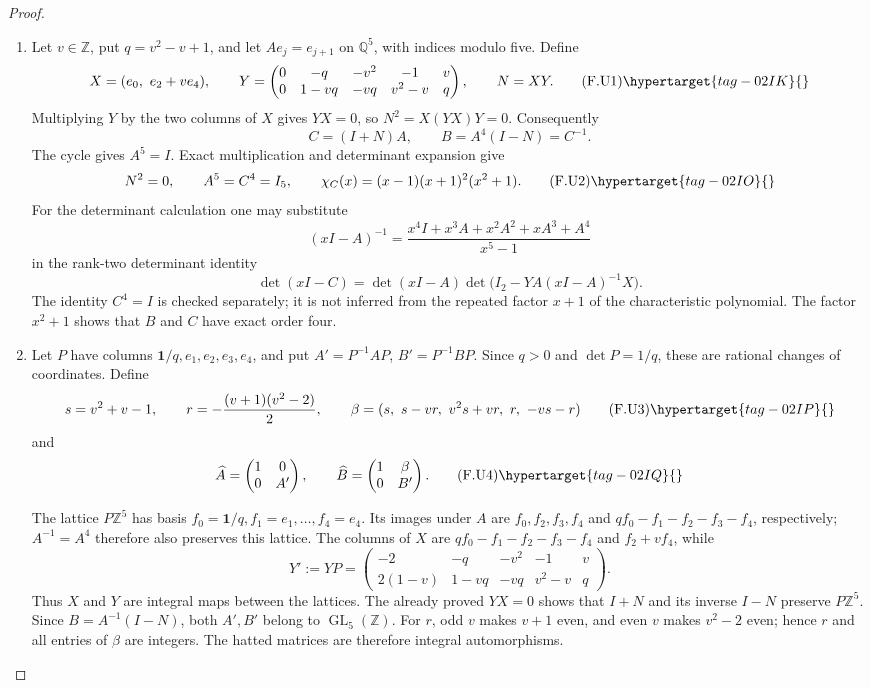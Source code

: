 \begin{proof}
\begin{enumerate}[label={$\langle1\rangle$\arabic*.}]
\item Let $v\in\mathbb Z$, put $q=v^2-v+1$, and let
$Ae_j=e_{j+1}$ on $\mathbb Q^5$, with indices modulo five. Define
\[
 X=(e_0,\ e_2+ve_4),\qquad
 Y=\begin{pmatrix}
 0&-q&-v^2&-1&v\\
 0&1-vq&-vq&v^2-v&q
 \end{pmatrix},\qquad N=XY.
 \tag{F.U1}\hypertarget{tag-02IK}{}\label{maps:eq:F.U1}
\]
Multiplying $Y$ by the two columns of $X$ gives $YX=0$, so
$N^2=X(YX)Y=0$. Consequently
\[
 C=(I+N)A,\qquad B=A^4(I-N)=C^{-1}.
\]
The cycle gives $A^5=I$. Exact multiplication and determinant
expansion give
\[
 N^2=0,\qquad A^5=C^4=I_5,\qquad
 \chi_C(x)=(x-1)(x+1)^2(x^2+1).
 \tag{F.U2}\hypertarget{tag-02IO}{}\label{maps:eq:F.U2}
\]
For the determinant calculation one may substitute
\[
 (xI-A)^{-1}=
 \frac{x^4I+x^3A+x^2A^2+xA^3+A^4}{x^5-1}
\]
in the rank-two determinant identity
\[
 \det(xI-C)=\det(xI-A)
       \det\bigl(I_2-YA(xI-A)^{-1}X\bigr).
\]
The identity $C^4=I$ is checked separately; it is not inferred
from the repeated factor $x+1$ of the characteristic polynomial.
The factor $x^2+1$ shows that $B$ and $C$ have exact order four.

\item Let $P$ have columns $\mathbf1/q,e_1,e_2,e_3,e_4$, and put
$A'=P^{-1}AP$, $B'=P^{-1}BP$. Since $q>0$ and $\det P=1/q$,
these are rational changes of coordinates. Define
\[
 s=v^2+v-1,\qquad r=-\frac{(v+1)(v^2-2)}2,
 \qquad
 \beta=(s,\ s-vr,\ v^2s+vr,\ r,\ -vs-r)
 \tag{F.U3}\hypertarget{tag-02IP}{}\label{maps:eq:F.U3}
\]
and
\[
 \widehat A=\begin{pmatrix}1&0\\0&A'\end{pmatrix},\qquad
 \widehat B=\begin{pmatrix}1&\beta\\0&B'\end{pmatrix}.
 \tag{F.U4}\hypertarget{tag-02IQ}{}\label{maps:eq:F.U4}
\]

The lattice $P\mathbb Z^5$ has basis
$f_0=\mathbf1/q,f_1=e_1,\ldots,f_4=e_4$.
Its images under $A$ are $f_0,f_2,f_3,f_4$ and
$qf_0-f_1-f_2-f_3-f_4$, respectively; $A^{-1}=A^4$
therefore also preserves this lattice. The columns of $X$ are
$qf_0-f_1-f_2-f_3-f_4$ and $f_2+vf_4$, while
\[
 Y':=YP=\begin{pmatrix}
 -2&-q&-v^2&-1&v\\
 2(1-v)&1-vq&-vq&v^2-v&q
 \end{pmatrix}.
\]
Thus $X$ and $Y$ are integral maps between the lattices.
The already proved $YX=0$ shows that $I+N$ and its inverse $I-N$
preserve $P\mathbb Z^5$. Since $B=A^{-1}(I-N)$, both
$A',B'$ belong to $\operatorname{GL}_5(\mathbb Z)$.
For $r$, odd $v$ makes $v+1$ even, and even $v$ makes
$v^2-2$ even; hence $r$ and all entries of $\beta$ are integers.
The hatted matrices are therefore integral automorphisms.


\end{enumerate}
\end{proof}
